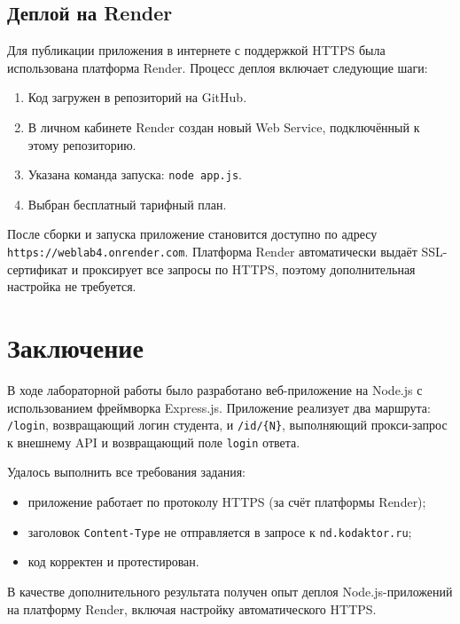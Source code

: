 \documentclass[a4paper,12pt]{article}
\begin{document}
\subsection{Деплой на Render}

Для публикации приложения в интернете с поддержкой HTTPS была
использована платформа Render. Процесс деплоя включает следующие
шаги:

\begin{enumerate}
  \item Код загружен в репозиторий на GitHub.
  \item В личном кабинете Render создан новый Web Service,
        подключённый к этому репозиторию.
  \item Указана команда запуска: \texttt{node app.js}.
  \item Выбран бесплатный тарифный план.
\end{enumerate}

После сборки и запуска приложение становится доступно по адресу
\texttt{https://weblab4.onrender.com}. Платформа Render
автоматически выдаёт SSL-сертификат и проксирует все запросы по
HTTPS, поэтому дополнительная настройка не требуется.

\section{Заключение}

В ходе лабораторной работы было разработано веб-приложение на
Node.js с использованием фреймворка Express.js. Приложение
реализует два маршрута: \texttt{/login}, возвращающий логин
студента, и \texttt{/id/\{N\}}, выполняющий прокси-запрос к
внешнему API и возвращающий поле \texttt{login} ответа.

Удалось выполнить все требования задания:
\begin{itemize}
  \item приложение работает по протоколу HTTPS (за счёт
        платформы Render);
  \item заголовок \texttt{Content-Type} не отправляется в
        запросе к \texttt{nd.kodaktor.ru};
  \item код корректен и протестирован.
\end{itemize}

В качестве дополнительного результата получен опыт деплоя
Node.js-приложений на платформу Render, включая настройку
автоматического HTTPS.
\end{document}
